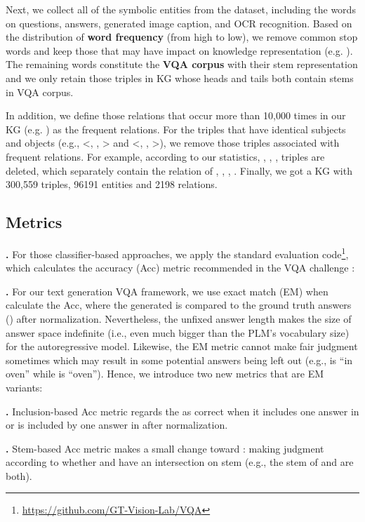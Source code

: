 \documentclass[sigconf]{acmart}
\newcommand{\cjy}[1]{{\color{black}#1}}
\begin{document}
Next, we collect all of the symbolic entities from the dataset, including the words on questions, answers, generated image caption, and OCR recognition.
Based on the distribution of \textbf{word frequency} (from high to low), we remove common stop words and keep those that may have impact on knowledge representation (e.g. ). 
The \cjy{remaining words}
constitute the \textbf{VQA corpus} with their stem representation and we only retain those triples in KG whose heads and tails both contain stems in VQA corpus.

In addition, we define those relations \cjy{that occur more than 10,000 times in our KG (e.g. ) as the frequent relations. }
\cjy{For the triples that have identical subjects and objects (e.g., <, , > and <, , >), 
we remove those triples associated with frequent relations}.
For example, according to our statistics, , , ,  triples are deleted, which separately contain the relation of , , , .
Finally, we got \cjy{a KG with 300,559 triples, 96191 entities and 2198 relations.}
\subsection{Metrics} \label{sec:acc}
\noindent\textbf{.} For those classifier-based approaches, we apply the standard 
evaluation code\footnote{\url{https://github.com/GT-Vision-Lab/VQA}}, which 
\cjy{calculates the accuracy (Acc)} metric recommended in the VQA challenge \citep{antol2015vqa}:



\noindent\textbf{.} For our text generation VQA framework, we use exact match (EM)  when calculate the Acc, where the generated  is compared to the ground truth answers () after normalization. 
Nevertheless, the unfixed answer length make\cjy{s} the size of answer space indefinite (i.e., even much bigger than \cjy{the PLM's vocabulary size}) for the autoregressive model. Likewise, the EM metric cannot make fair judgment sometimes which may result in some potential answers being left out (e.g.,  is ``in oven'' while  is ``oven'').
Hence, we introduce two \cjy{new metrics that are EM variants:}

\noindent\textbf{.} Inclusion-based Acc metric  regards the  as correct when it includes \cjy{one answer in  or is included by one answer} in  after normalization.

\noindent\textbf{.} Stem-based  Acc metric makes a small change toward : making judgment according to whether  and  have an intersection on stem (e.g., the stem of  and  are both).
\end{document}
